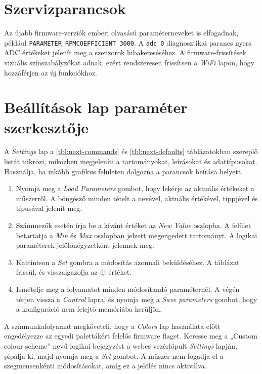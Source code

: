 \section{Szervizparancsok}
Az újabb firmware-verziók emberi olvasású paraméterneveket is elfogadnak, például \verb|PARAMETER_RPMCOEFFICIENT 3000|. A \verb|adc 0| diagnosztikai parancs nyers ADC értékeket jelenít meg a szenzorok hibakereséséhez. A firmware-frissítések vizuális színszabályzókat adnak, ezért rendszeresen frissítsen a \emph{WiFi} lapon, hogy hozzáférjen az új funkciókhoz.

\section{Beállítások lap paraméter szerkesztője}
A \emph{Settings} lap a \autoref{tbl:next-commands} és \autoref{tbl:next-defaults} táblázatokban szereplő listát tükrözi, miközben megjeleníti a tartományokat, leírásokat és adattípusokat. Használja, ha inkább grafikus felületen dolgozna a parancsok beírása helyett.

\begin{enumerate}
    \item Nyomja meg a \emph{Load Parameters} gombot, hogy lekérje az aktuális értékeket a műszerről. A böngésző minden tételt a nevével, aktuális értékével, tippjével és típusával jelenít meg.
    \item Számmezők esetén írja be a kívánt értéket az \emph{New Value} oszlopba. A felület betartatja a \emph{Min} és \emph{Max} oszlopban jelzett megengedett tartományt. A logikai paraméterek jelölőnégyzetként jelennek meg.
    \item Kattintson a \emph{Set} gombra a módosítás azonnali beküldéséhez. A táblázat frissül, és visszaigazolja az új értéket.
    \item Ismételje meg a folyamatot minden módosítandó paraméternél. A végén térjen vissza a \emph{Control} lapra, és nyomja meg a \emph{Save parameters} gombot, hogy a konfiguráció nem felejtő memóriába kerüljön.
\end{enumerate}

A színmunkafolyamat megköveteli, hogy a \emph{Colors} lap használata előtt engedélyezze az egyedi palettákért felelős firmware flaget. Keresse meg a „Custom colour scheme” nevű logikai bejegyzést a webes vezérlőpult \emph{Settings} lapján, pipálja ki, majd nyomja meg a \emph{Set} gombot. A műszer nem fogadja el a szegmensenkénti módosításokat, amíg ez a jelölés nincs aktiválva.

